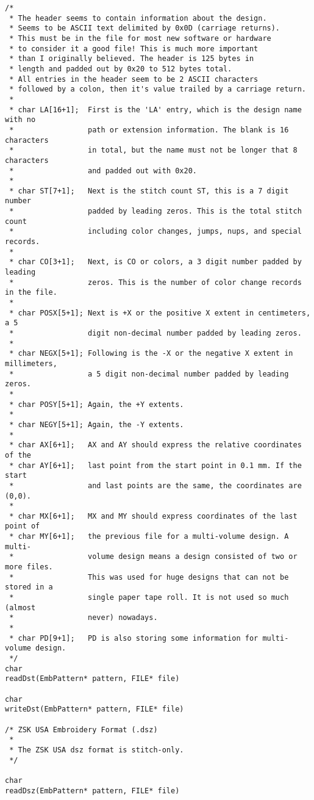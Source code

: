 \begin{lstlisting}
/*
 * The header seems to contain information about the design.
 * Seems to be ASCII text delimited by 0x0D (carriage returns).
 * This must be in the file for most new software or hardware
 * to consider it a good file! This is much more important
 * than I originally believed. The header is 125 bytes in
 * length and padded out by 0x20 to 512 bytes total.
 * All entries in the header seem to be 2 ASCII characters
 * followed by a colon, then it's value trailed by a carriage return.
 *
 * char LA[16+1];  First is the 'LA' entry, which is the design name with no
 *                 path or extension information. The blank is 16 characters
 *                 in total, but the name must not be longer that 8 characters
 *                 and padded out with 0x20.
 *
 * char ST[7+1];   Next is the stitch count ST, this is a 7 digit number
 *                 padded by leading zeros. This is the total stitch count
 *                 including color changes, jumps, nups, and special records.
 *
 * char CO[3+1];   Next, is CO or colors, a 3 digit number padded by leading
 *                 zeros. This is the number of color change records in the file.
 *
 * char POSX[5+1]; Next is +X or the positive X extent in centimeters, a 5
 *                 digit non-decimal number padded by leading zeros.
 *
 * char NEGX[5+1]; Following is the -X or the negative X extent in millimeters,
 *                 a 5 digit non-decimal number padded by leading zeros.
 *
 * char POSY[5+1]; Again, the +Y extents.
 *
 * char NEGY[5+1]; Again, the -Y extents.
 *
 * char AX[6+1];   AX and AY should express the relative coordinates of the
 * char AY[6+1];   last point from the start point in 0.1 mm. If the start
 *                 and last points are the same, the coordinates are (0,0).
 *
 * char MX[6+1];   MX and MY should express coordinates of the last point of
 * char MY[6+1];   the previous file for a multi-volume design. A multi-
 *                 volume design means a design consisted of two or more files.
 *                 This was used for huge designs that can not be stored in a
 *                 single paper tape roll. It is not used so much (almost
 *                 never) nowadays.
 *
 * char PD[9+1];   PD is also storing some information for multi-volume design.
 */
char
readDst(EmbPattern* pattern, FILE* file)

char
writeDst(EmbPattern* pattern, FILE* file)

/* ZSK USA Embroidery Format (.dsz)
 *
 * The ZSK USA dsz format is stitch-only.
 */

char
readDsz(EmbPattern* pattern, FILE* file)


\end{lstlisting}
